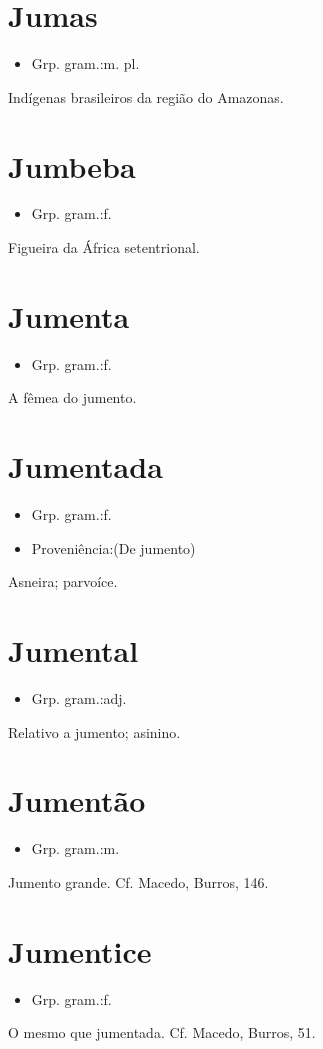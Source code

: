 \documentclass{article}
\begin{document}
\section{Jumas}
\begin{itemize}
\item {Grp. gram.:m. pl.}
\end{itemize}
Indígenas brasileiros da região do Amazonas.
\section{Jumbeba}
\begin{itemize}
\item {Grp. gram.:f.}
\end{itemize}
Figueira da África setentrional.
\section{Jumenta}
\begin{itemize}
\item {Grp. gram.:f.}
\end{itemize}
A fêmea do jumento.
\section{Jumentada}
\begin{itemize}
\item {Grp. gram.:f.}
\end{itemize}
\begin{itemize}
\item {Proveniência:(De \textunderscore jumento\textunderscore )}
\end{itemize}
Asneira; parvoíce.
\section{Jumental}
\begin{itemize}
\item {Grp. gram.:adj.}
\end{itemize}
Relativo a jumento; asinino.
\section{Jumentão}
\begin{itemize}
\item {Grp. gram.:m.}
\end{itemize}
Jumento grande. Cf. Macedo, \textunderscore Burros\textunderscore , 146.
\section{Jumentice}
\begin{itemize}
\item {Grp. gram.:f.}
\end{itemize}
O mesmo que \textunderscore jumentada\textunderscore . Cf. Macedo, \textunderscore Burros\textunderscore , 51.
\end{document}
